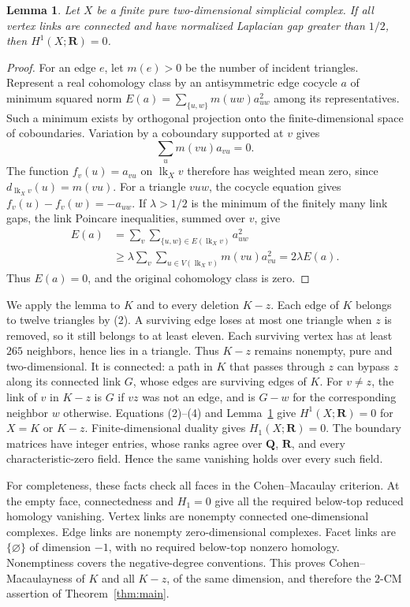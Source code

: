 \documentclass[10pt]{article}
\newtheorem{lemma}[theorem]{Lemma}
\newcommand{\Q}{\mathbf Q}
\newcommand{\R}{\mathbf R}
\newcommand{\lk}{\operatorname{lk}}
\begin{document}
\begin{lemma}\label{lem:vanish}
Let $X$ be a finite pure two-dimensional simplicial complex. If all vertex
links are connected and have normalized Laplacian gap greater than $1/2$,
then $H^1(X;\R)=0$.
\end{lemma}
\begin{proof}
For an edge $e$, let $m(e)>0$ be the number of incident triangles.
Represent a real cohomology class by an antisymmetric edge cocycle $a$ of
minimum squared norm
$E(a)=\sum_{\{u,w\}}m(uw)a_{uw}^2$ among its representatives.
Such a minimum exists by orthogonal projection onto the finite-dimensional
space of coboundaries. Variation by a coboundary supported at $v$ gives
\[
                        \sum_u m(vu)a_{vu}=0.
\]
The function $f_v(u)=a_{vu}$ on $\lk_X v$ therefore has weighted mean zero,
since $d_{\lk_X v}(u)=m(vu)$.
For a triangle $vuw$, the cocycle equation gives
$f_v(u)-f_v(w)=-a_{uw}$. If $\lambda>1/2$ is the minimum of the finitely many
link gaps, the link Poincare inequalities, summed over $v$, give
\[
 \begin{split}
 E(a)
 &=\sum_v\sum_{\{u,w\}\in E(\lk_X v)}a_{uw}^2\\
 &\geq\lambda\sum_v\sum_{u\in V(\lk_X v)}m(vu)a_{vu}^2
 =2\lambda E(a).
 \end{split}
\]
Thus $E(a)=0$, and the original cohomology class is zero.
\end{proof}

We apply the lemma to $K$ and to every deletion $K-z$.
Each edge of $K$ belongs to twelve triangles by (2). A surviving edge loses at
most one triangle when $z$ is removed, so it still belongs to at least eleven.
Each surviving vertex has at least $265$ neighbors, hence lies in a triangle.
Thus $K-z$ remains nonempty, pure and two-dimensional.
It is connected: a path in $K$ that passes through $z$ can bypass $z$ along
its connected link $G$, whose edges are surviving edges of $K$.
For $v\ne z$, the link of $v$ in $K-z$ is $G$ if $vz$ was not an edge, and is
$G-w$ for the corresponding neighbor $w$ otherwise.
Equations (2)--(4) and Lemma~\ref{lem:vanish} give $H^1(X;\R)=0$ for
$X=K$ or $K-z$. Finite-dimensional duality gives $H_1(X;\R)=0$.
The boundary matrices have integer entries, whose ranks agree over $\Q$,
$\R$, and every characteristic-zero field. Hence the same vanishing holds
over every such field.

For completeness, these facts check all faces in the Cohen--Macaulay
criterion. At the empty face, connectedness and $H_1=0$ give all the required
below-top reduced homology vanishing. Vertex links are nonempty connected
one-dimensional complexes. Edge links are nonempty zero-dimensional complexes.
Facet links are $\{\varnothing\}$ of dimension $-1$, with no required
below-top nonzero homology. Nonemptiness covers the negative-degree
conventions. This proves Cohen--Macaulayness of $K$ and all $K-z$, of the same
dimension, and therefore the $2$-CM assertion of Theorem~\ref{thm:main}.
\end{document}
